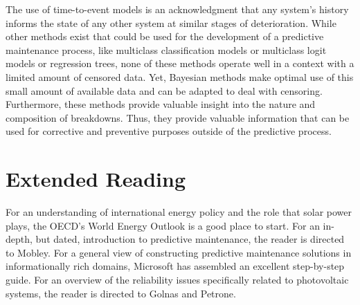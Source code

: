 The use of time-to-event models is an acknowledgment that any system's history informs the state of any other system at similar stages of deterioration. While other methods exist that could be used for the development of a predictive maintenance process, like multiclass classification models or multiclass logit models or regression trees, none of these methods operate well in a context with a limited amount of censored data. Yet, Bayesian methods make optimal use of this small amount of available data and can be adapted to deal with censoring. Furthermore, these methods provide valuable insight into the nature and composition of breakdowns. Thus, they provide valuable information that can be used for corrective and preventive purposes outside of the predictive process.


\section{Extended Reading}

For an understanding of international energy policy and the role that solar power plays, the OECD's World Energy Outlook is a good place to start\cite{EIAOutlook2016}. For an in-depth, but dated, introduction to predictive maintenance, the reader is directed to Mobley\cite{Mobley2002}. For a general view of constructing predictive maintenance solutions in informationally rich domains, Microsoft has assembled an excellent step-by-step guide\cite{Uz2016}. For an overview of the reliability issues specifically related to photovoltaic systems, the reader is directed to Golnas\cite{Golnas2013} and Petrone\cite{Petrone2008}. 


